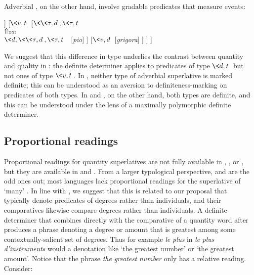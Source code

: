 \documentclass[output=paper
,modfonts
,nonflat]{langsci/langscibook}
\begin{document}
Adverbial , on the other hand, involve gradable predicates that measure events: 

\ea \label{ex:coppockstrand:108}
\begin{forest}
	[{$\<v,t\>$\\(by Predicate Modification)}
		[{$\<v,t\>$} [VP]
		]
		[{$\<v,t\>$}
			[{$\<\<\tau,d\>,\<\tau,t\>\>$\\$\Uparrow_{\textsc{dni}}$\\$\<d,\<\<\tau,d\>,\<\tau,t\>\>\>$} [\textit{pio}]
			]
			[{$\<v,d\>$} [\textit{grigora}]
			]
		]
	]
\end{forest}
\z 

We suggest that this difference in type underlies the contrast between quantity and quality  in : the  definite determiner applies to predicates of type $\<d,t\>$ but not ones of type $\<v,t\>$.  In , neither type of adverbial superlative is marked definite; this can be understood as an aversion to definiteness-marking on predicates of both types. In  and , on the other hand, both types are definite, and this can be understood under the  lens of a maximally polymorphic definite determiner.

\subsection{Proportional readings}

Proportional readings for quantity superlatives are not fully available in , , or , but they are available in  and . From a larger typological perspective,  and  are the odd ones out; most languages lack proportional readings for the superlative of `many' \citep{CoppockEtAlii2017}. In line with \citet{CoppockEtAliiinprep}, 
 we suggest that this is related to our proposal that  typically denote predicates of degrees rather than individuals, and their comparatives likewise compare degrees rather than individuals. A definite determiner that combines directly with the comparative of a quantity word after  produces a phrase denoting a degree or amount that is greatest among some contextually-salient set of degrees. Thus for example \textit{le plus} in \textit{le plus d'instruments} would a denotation like `the greatest number' or `the greatest amount'. Notice that the phrase \textit{the greatest number} only has a relative reading. Consider:
\end{document}
